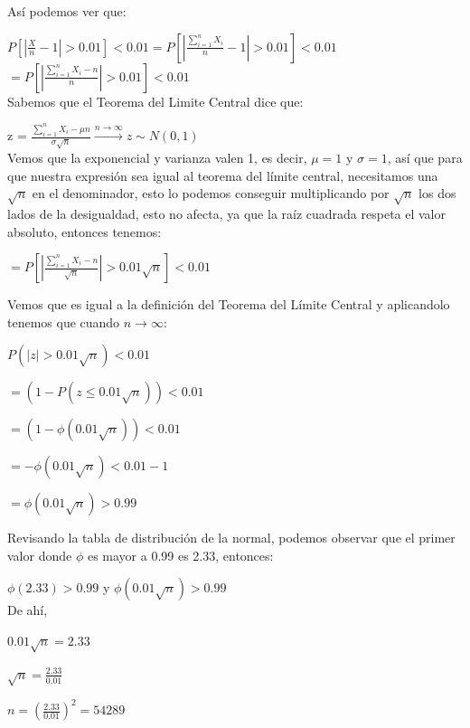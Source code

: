 \documentclass[11pt,a4paper]{report}
\begin{document}
\begin{enumerate}
{          Así podemos ver que:
          
           $P[|\frac{X}{n}-1| > 0.01] < 0.01 = P[|\frac{\sum_{i=1}^{n} X_{i}}{n}-1| > 0.01] < 0.01$\\
           
           $= P[|\frac{\sum_{i=1}^{n} X_{i} -n}{n}| > 0.01] < 0.01$\\
           
           Sabemos que el Teorema del Limite Central dice que:
				
 				z = $\frac{\sum_{i=1}^{n} X_{i} - \mu n }{\sigma \sqrt{n}}  \xrightarrow{n \to \infty}  z \sim N(0,1)$\\
			            
          Vemos que la exponencial y varianza valen 1, es decir, $\mu = 1$ y $\sigma = 1$, así que para que nuestra expresión sea igual al teorema del límite central, necesitamos una $\sqrt{n}$ en el denominador, esto lo podemos conseguir multiplicando por $\sqrt{n}$ los dos lados de la desigualdad, esto no afecta, ya que la raíz cuadrada respeta el valor absoluto, entonces tenemos:
          
          $= P[|\frac{\sum_{i=1}^{n} X_{i} -n}{\sqrt{n}}| > 0.01\sqrt{n}] < 0.01$
          
          Vemos que es igual a la definición del Teorema del Límite Central y aplicandolo tenemos que cuando $n \to \infty$:
          
          $P( |z| > 0.01\sqrt{n} ) < 0.01$
          
          $ = (1 - P(z \leq 0.01\sqrt{n})) < 0.01$
          
          $ = (1 - \phi(0.01\sqrt{n})) < 0.01$
          
          $ = - \phi(0.01\sqrt{n}) < 0.01 - 1$
          
         $ = \phi(0.01\sqrt{n}) > 0.99$
          
        Revisando la tabla de distribución de la normal, podemos observar que el primer valor donde $\phi$ es mayor a 0.99 es 2.33, entonces:
        
        $\phi(2.33) > 0.99$  y  $\phi(0.01\sqrt{n}) > 0.99$\\
        
        De ahí, 
        
        $0.01\sqrt{n} = 2.33$
        
        $\sqrt{n} = \frac{2.33}{0.01}$
        
        $n = (\frac{2.33}{0.01}) ^ 2 = 54289$\\
        
}
\end{enumerate}
\end{document}
